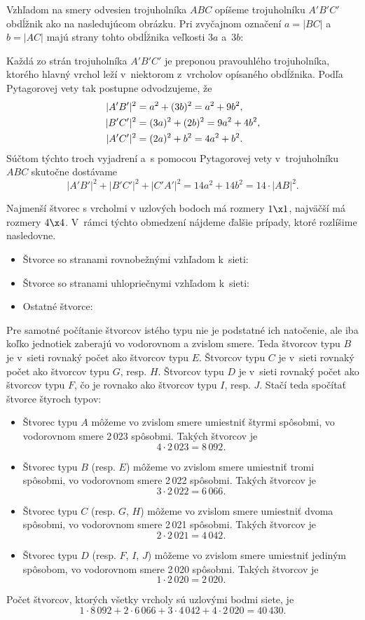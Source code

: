 {%
Vzhľadom na smery odvesien trojuholníka $ABC$ opíšeme trojuholníku $A'B'C'$ obdĺžnik ako na nasledujúcom obrázku.
Pri zvyčajnom označení $a=|BC|$ a~$b=|AC|$ majú strany tohto obdĺžnika veľkosti $3a$ a~$3b$:
%


Každá zo strán trojuholníka $A'B'C'$ je preponou pravouhlého trojuholníka, ktorého hlavný vrchol leží v~niektorom z~vrcholov opísaného obdĺžnika.
Podľa Pytagorovej vety tak postupne odvodzujeme, že
$$
\aligned
\vert{}A'B'\vert{}^2 &=a^2+(3b)^2 =a^2+9b^2,\\
\vert{}B'C'\vert{}^2 &=(3a)^2+(2b)^2 =9a^2+4b^2,\\
\vert{}A'C'\vert{}^2 &=(2a)^2+b^2 =4a^2+b^2.
\endaligned
$$
Súčtom týchto troch vyjadrení a~s pomocou Pytagorovej vety v~trojuholníku $ABC$ skutočne dostávame
$$
|A'B'|^2 + |B'C'|^2 + |C'A'|^2 =14a^2+14b^2 =14\cdot |AB|^2.
$$
}

{%
Najmenší štvorec s vrcholmi v uzlových bodoch má rozmery $1\x 1$, najväčší má rozmery $4\x 4$.
V~rámci týchto obmedzení nájdeme ďalšie prípady, ktoré rozlíšime nasledovne.
\begin{itemize}
\item Štvorce so stranami rovnobežnými vzhľadom k~sieti:
%
\item Štvorce so stranami uhlopriečnymi vzhľadom k~sieti:
%
\item Ostatné štvorce:
%
\end{itemize}
Pre samotné počítanie štvorcov istého typu nie je podstatné ich natočenie, ale iba koľko jednotiek zaberajú vo vodorovnom a zvislom smere.
Teda štvorcov typu $B$ je v~sieti rovnaký počet ako štvorcov typu $E$.
Štvorcov typu $C$ je v~sieti rovnaký počet ako štvorcov typu $G$, resp. $H$.
Štvorcov typu $D$ je v~sieti rovnaký počet ako štvorcov typu $F$, čo je rovnako ako štvorcov typu $I$, resp. $J$.
Stačí teda spočítať štvorce štyroch typov:
\begin{itemize}
\item Štvorec typu $A$ môžeme vo zvislom smere umiestniť štyrmi spôsobmi, vo vodorovnom smere 2\,023 spôsobmi.
Takých štvorcov je
$$
4\cdot2\,023 =8\,092 .
$$
\item Štvorec typu $B$ (resp. $E$) môžeme vo zvislom smere umiestniť tromi spôsobmi, vo vodorovnom smere 2\,022 spôsobmi.
Takých štvorcov je
$$
3\cdot2\,022 =6\,066 .
$$
\item Štvorec typu $C$ (resp. $G$, $H$) môžeme vo zvislom smere umiestniť dvoma spôsobmi, vo vodorovnom smere 2\,021 spôsobmi.
Takých štvorcov je
$$
2\cdot2\,021 =4\,042 .
$$
\item Štvorec typu $D$ (resp. $F$, $I$, $J$) môžeme vo zvislom smere umiestniť jediným spôsobom, vo vodorovnom smere 2\,020 spôsobmi.
Takých štvorcov je
$$
1\cdot2\,020 =2\,020 .
$$
\end{itemize}
Počet štvorcov, ktorých všetky vrcholy sú uzlovými bodmi siete, je
$$
1\cdot8\,092 + 2\cdot6\,066 + 3\cdot4\,042 + 4\cdot2\,020 =40\,430 .
$$
}


